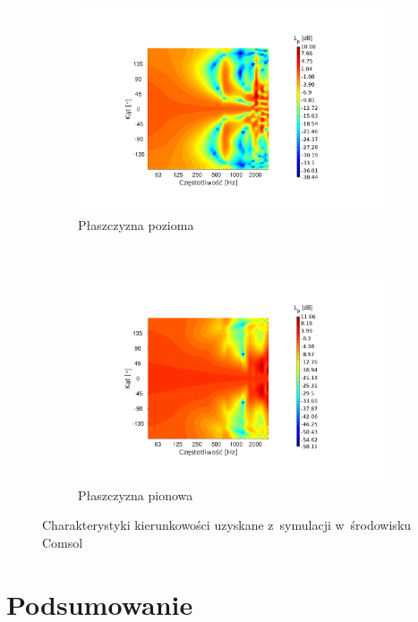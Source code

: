 \documentclass[12pt]{oska}
\begin{document}
		\begin{figure}[!ht]
			\centering
			\begin{subfigure}[b]{.49\textwidth}
			\includegraphics[width=\textwidth,trim={4.6cm 2.6cm 5.8cm 2.7cm},clip]{Comsol_kier_osie_hor.pdf}
				\caption{Płaszczyzna pozioma}
				\label{r:C_poziom}
			\end{subfigure}
			~
			\begin{subfigure}[b]{.49\textwidth}
				\includegraphics[width=\textwidth,trim={4.6cm 2.6cm 5.8cm 2.7cm},clip]{Comsol_kier_osie_ver.pdf}
				\caption{Płaszczyzna pionowa}
				\label{r:C_pion}
			\end{subfigure}
			
			\caption{Charakterystyki kierunkowości uzyskane z~symulacji w~środowisku Comsol}
			\label{r:C_kierunk}
		\end{figure}
		
\section{Podsumowanie}
	
\end{document}
